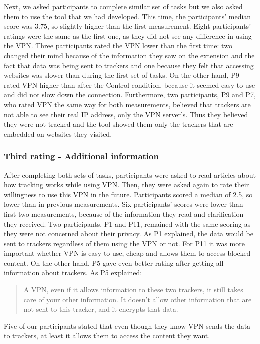 Next, we asked participants to complete similar set of tasks but we also asked
them to use the tool that we had developed. This time, the participants'
median score was  3.75, so slightly higher than the first measurement. Eight
participants' ratings were the same as the first one, as they did not see any
difference in using the VPN. Three participants rated the VPN lower than the
first time: two changed their mind because of the information they saw on the
extension and the fact that data was being sent to trackers and one because
they felt that accessing websites was slower than during the first set of
tasks.  On the other hand, P9 rated VPN higher than after the Control
condition, because it seemed easy to use and did not slow down the connection.
Furthermore, two participants, P9 and P7, who rated VPN the same way for both
measurements, believed that trackers are not able to see their real IP
address, only the VPN server’s. Thus they believed they were not tracked and
the tool showed them only the trackers that are embedded on websites they
visited. 

\subsubsection{Third rating - Additional information} 

After completing both sets of tasks, participants were asked to read articles
about how tracking works while using VPN. Then, they were asked again to rate
their willingness to use this VPN in the future. Participants scored a median
of 2.5, so lower than in previous measurements. Six participants' scores were
lower than first two measurements, because of the information they read and
clarification they received. Two participants, P1 and P11, remained with the
same scoring as they were not concerned about their privacy. As P1 explained,
the data would be sent to trackers regardless of them using the VPN or not.
For P11 it was more important whether VPN is easy to use, cheap and allows
them to access blocked content. On the other hand, P5 gave even better rating
after getting all information about trackers. As P5 explained:

\begin{quote}A VPN, even if it allows information to these two trackers, it
still takes care of your other information. It doesn't allow other information
that are not sent to this tracker, and it encrypts that data.\end{quote} Five
of our participants stated that even though they know VPN sends the data to
trackers, at least it allows them to access the content they want.   


